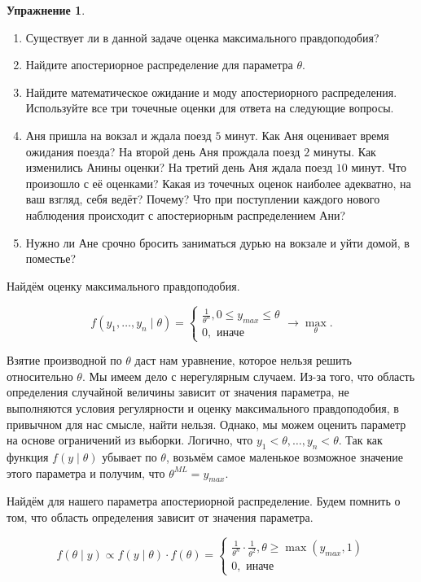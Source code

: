 \documentclass[12pt, a4paper, oneside]{extreport}
\theoremstyle{plain}              %
\theoremstyle{definition}         %
\newtheorem{problem}{\color{myblue} Упражнение}
\begin{document}
\begin{problem}
\begin{enumerate}
\item Существует ли в данной задаче оценка максимального правдоподобия?
\item Найдите апостериорное распределение для параметра $\theta$.
\item Найдите математическое ожидание и моду апостериорного распределения. Используйте все три точечные оценки для ответа на следующие вопросы.
\item Аня пришла на вокзал и ждала поезд $5$ минут. Как Аня оценивает время ожидания поезда? На второй  день Аня прождала поезд $2$ минуты. Как изменились Анины оценки?  На третий день Аня ждала поезд $10$ минут. Что произошло с её оценками? Какая из точечных оценок наиболее адекватно, на ваш взгляд, себя ведёт? Почему? Что при поступлении каждого нового наблюдения происходит с апостериорным распределением Ани?  
\item Нужно ли Ане срочно бросить заниматься дурью на вокзале и уйти домой, в поместье?
\end{enumerate} 
\begin{sol}
Найдём оценку максимального правдоподобия. 

\[f(y_1, \ldots, y_n \mid \theta) = \begin{cases}  \frac{1}{\theta^n}, 0 \le y_{max} \le \theta \\ 0, \text{ иначе} \end{cases}  \to \max_{\theta}.\]

Взятие производной по $\theta$ даст нам уравнение, которое нельзя решить относительно $\theta$. Мы имеем дело с нерегулярным случаем. Из-за того, что область определения случайной величины зависит от значения параметра, не выполняются условия регулярности и оценку максимального правдоподобия, в привычном для нас смысле, найти нельзя. Однако, мы можем оценить параметр на основе ограничений из выборки. Логично, что $y_1 < \theta, \ldots, y_n < \theta$. Так как функция $f(y \mid \theta)$ убывает по $\theta$, возьмём самое маленькое возможное значение этого параметра и получим, что $\theta^{ML} = y_{max}$.

Найдём для нашего параметра апостериорной распределение. Будем помнить о том, что область определения зависит от значения параметра.

\[ f(\theta \mid y) \propto f(y \mid \theta) \cdot f(\theta) = \begin{cases} \frac{1}{\theta^n} \cdot \frac{1}{\theta^2}, \theta \ge \max(y_{max},1) \\ 0, \text{ иначе} \end{cases}\]


\end{sol}
\end{problem}
\end{document}
